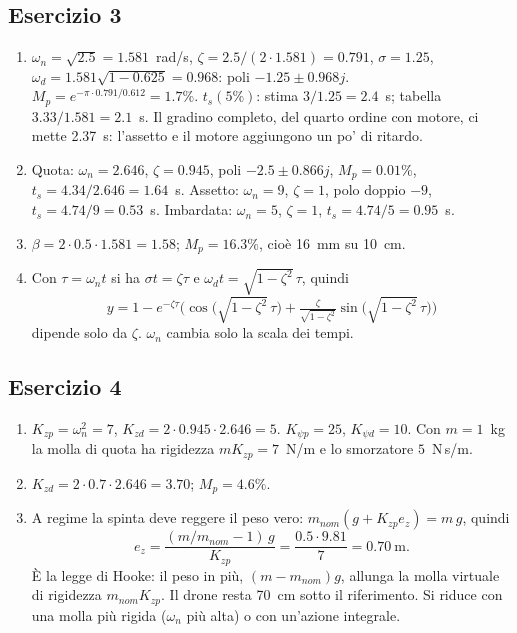 \documentclass[11pt,a4paper]{article}
\begin{document}
\subsection*{Esercizio 3}
\begin{enumerate}[label=(\alph*)]
  \item $\omega_n = \sqrt{2.5} = 1.581$~rad/s, $\zeta = 2.5/(2 \cdot 1.581) = 0.791$, $\sigma = 1.25$, $\omega_d = 1.581\sqrt{1 - 0.625} = 0.968$: poli $-1.25 \pm 0.968j$. $M_p = e^{-\pi \cdot 0.791/0.612} = 1.7\%$. $t_s(5\%)$: stima $3/1.25 = 2.4$~s; tabella $3.33/1.581 = 2.1$~s. Il gradino completo, del quarto ordine con motore, ci mette 2.37~s: l'assetto e il motore aggiungono un po' di ritardo.
  \item Quota: $\omega_n = 2.646$, $\zeta = 0.945$, poli $-2.5 \pm 0.866j$, $M_p = 0.01\%$, $t_s = 4.34/2.646 = 1.64$~s. Assetto: $\omega_n = 9$, $\zeta = 1$, polo doppio $-9$, $t_s = 4.74/9 = 0.53$~s. Imbardata: $\omega_n = 5$, $\zeta = 1$, $t_s = 4.74/5 = 0.95$~s.
  \item $\beta = 2 \cdot 0.5 \cdot 1.581 = 1.58$; $M_p = 16.3\%$, cioè 16~mm su 10~cm.
  \item Con $\tau = \omega_n t$ si ha $\sigma t = \zeta\tau$ e $\omega_d t = \sqrt{1-\zeta^2}\,\tau$, quindi
  \[
  y = 1 - e^{-\zeta\tau}\Big(\cos\big(\sqrt{1-\zeta^2}\,\tau\big) + \tfrac{\zeta}{\sqrt{1-\zeta^2}}\sin\big(\sqrt{1-\zeta^2}\,\tau\big)\Big)
  \]
  dipende solo da $\zeta$. $\omega_n$ cambia solo la scala dei tempi.
\end{enumerate}

\subsection*{Esercizio 4}
\begin{enumerate}[label=(\alph*)]
  \item $K_{zp} = \omega_n^2 = 7$, $K_{zd} = 2 \cdot 0.945 \cdot 2.646 = 5$. $K_{\psi p} = 25$, $K_{\psi d} = 10$. Con $m = 1$~kg la molla di quota ha rigidezza $mK_{zp} = 7$~N/m e lo smorzatore $5$~N\,s/m.
  \item $K_{zd} = 2 \cdot 0.7 \cdot 2.646 = 3.70$; $M_p = 4.6\%$.
  \item A regime la spinta deve reggere il peso vero: $m_{nom}(g + K_{zp}e_z) = m\,g$, quindi
  \[
  e_z = \frac{(m/m_{nom} - 1)\,g}{K_{zp}} = \frac{0.5 \cdot 9.81}{7} = 0.70\ \mathrm{m}.
  \]
  È la legge di Hooke: il peso in più, $(m - m_{nom})g$, allunga la molla virtuale di rigidezza $m_{nom}K_{zp}$. Il drone resta 70~cm sotto il riferimento. Si riduce con una molla più rigida ($\omega_n$ più alta) o con un'azione integrale.
\end{enumerate}
\end{document}

